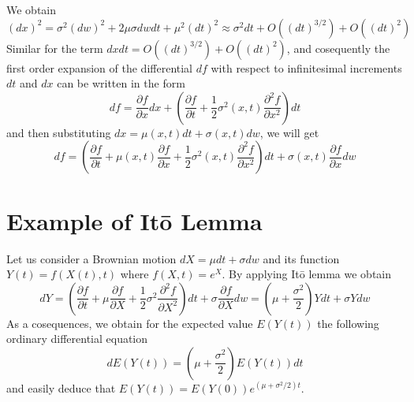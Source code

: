 \documentclass[a4paper]{article}
\begin{document}
We obtain 
\begin{equation}
    (d x)^{2}=\sigma^{2}(d w)^{2}+2 \mu \sigma d w d t+\mu^{2}(d t)^{2} \approx \sigma^{2} d t+O\left((d t)^{3 / 2}\right)+O\left((d t)^{2}\right)
\end{equation}
Similar for the term $d x d t=O\left((d t)^{3 / 2}\right)+O\left((d t)^{2}\right)$, and cosequently the first order expansion of the differential $df$ with respect to infinitesimal increments $dt$
and $dx$ can be written in the form 
\begin{equation}
    d f=\frac{\partial f}{\partial x} d x+\left(\frac{\partial f}{\partial t}+\frac{1}{2} \sigma^{2}(x, t) \frac{\partial^{2} f}{\partial x^{2}}\right) d t
\end{equation}
and then substituting $d x=\mu(x, t) d t+\sigma(x, t) d w$, we will get
\begin{equation}
    d f=\left(\frac{\partial f}{\partial t}+\mu(x, t) \frac{\partial f}{\partial x}+\frac{1}{2} \sigma^{2}(x, t) \frac{\partial^{2} f}{\partial x^{2}}\right) d t+\sigma(x, t) \frac{\partial f}{\partial x} d w
\end{equation}
\section{Example of It\={o} Lemma}
Let us consider a Brownian motion $dX = \mu dt + \sigma dw$ and its function $Y(t)=f(X(t),t)$ where $f(X,t) = e^X$. By applying It\={o} lemma we obtain
\begin{equation}
    d Y=\left(\frac{\partial f}{\partial t}+\mu \frac{\partial f}{\partial X}+\frac{1}{2} \sigma^{2} \frac{\partial^{2} f}{\partial X^{2}}\right) d t+\sigma \frac{\partial f}{\partial X} d w=\left(\mu+\frac{\sigma^{2}}{2}\right) Y d t+\sigma Y d w
\end{equation}
As a cosequences, we obtain for the expected value $E(Y(t))$ the following ordinary differential equation
\begin{equation}
    d E(Y(t))=\left(\mu+\frac{\sigma^{2}}{2}\right) E(Y(t)) d t
\end{equation}
and easily deduce that $E(Y(t))=E(Y(0)) e^{\left(\mu+\sigma^{2} / 2\right) t}$.
\end{document}
